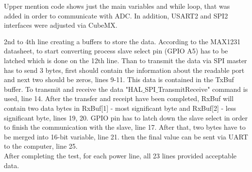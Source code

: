	 Upper mention code shows just the main variables and while loop, that was added in order to communicate with ADC. In addition, USART2 and SPI2 interfaces were adjusted via CubeMX.
	 
	 2nd to 4th line creating a buffers to store the data. According to the MAX1231 datasheet, to start converting process slave select pin (GPIO A5) has to be latched which is done on the 12th line.
	 Than to transmit the data via SPI master has to send 3 bytes, first should contain the information about the readable port and next two should be zeros, lines 9-11. This data is contained in the TxBuf buffer. To transmit and receive the data "HAL$\_$SPI$\_$TransmitReceive" command is used, line 14. After the transfer and receipt have been completed, RxBuf will contain two data bytes in RxBuf[1] - most significant byte and RxBuf[2] - less significant byte, lines 19, 20. GPIO pin has to latch down the slave select in order to finish the communication with the slave, line 17. After that, two bytes have to be merged into 16-bit variable, line 21. then the final value can be sent via UART to the computer, line 25.\\
	 After completing the test, for each power line, all 23 lines provided acceptable data.
	 
	 
		